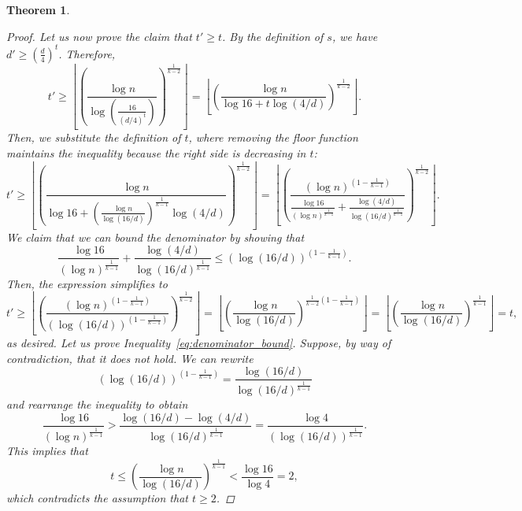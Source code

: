 \documentclass{amsart}
\newtheorem{theorem}[subsection]{Theorem}
\begin{document}
\begin{theorem}
\begin{proof}
        Let us now prove the claim that $t' \geq t$.
        By the definition of $s$, we have $d' \geq \left( \frac{d}{4}\right)^t$.
        Therefore,
        \[
            t' \geq
\left\lfloor \left(  \frac{\log n}{\log \left(\frac{16}{(d/4)^t}\right)}\right)^
            {\frac{1}{k-2}}\right\rfloor =
\left\lfloor \left(  \frac{\log n}{\log 16 + t \log (4/d)}\right)^
            {\frac{1}{k-2}}\right\rfloor.
        \]
        Then, we substitute the definition of $t$, where removing the floor function
        maintains the inequality because the right side is decreasing in $t$:
        \begin{equation*}
            t' \geq
\left\lfloor \left(  \frac{\log n}
            {\log 16 + \left(  \frac{\log n}{\log (16/d)}\right)^{\frac{1}{k-1}}  \log (4/d)}\right)^
            {\frac{1}{k-2}}\right\rfloor
            =
\left\lfloor \left(  \frac{(\log n)^{\left(1-\frac{1}{k-1}\right)}}
            {\frac{\log 16}{(\log n)^{\frac{1}{k-1}}} + \frac{\log (4/d)}{\log (16/d)^{\frac{1}{k-1}}} }
           \right)^{\frac{1}{k-2}}\right\rfloor.
        \end{equation*}
        We claim that we can bound the denominator by showing that
        \begin{equation} \label{eq:denominator_bound}
            \frac{\log 16}{(\log n)^{\frac{1}{k-1}}} + \frac{\log (4/d)}{\log (16/d)^{\frac{1}{k-1}}}
            \leq \left( \log (16/d)\right)^{\left( 1 - \frac{1}{k-1}\right)}.
        \end{equation}
        Then, the expression simplifies to
        \[
            t'
\geq \left\lfloor \left(  \frac{(\log n)^{\left(1-\frac{1}{k-1}\right)}}
            {\left( \log (16/d)\right)^{\left( 1 - \frac{1}{k-1}\right)}}
            \right)^{\frac{1}{k-2}}\right\rfloor
= \left\lfloor \left(  \frac{\log n}
            {\log (16/d)}
            \right)^{\frac{1}{k-2}\left( 1 - \frac{1}{k-1}\right)}\right\rfloor
            = \left\lfloor \left(  \frac{\log n}{\log (16/d)}\right)^{\frac{1}{k-1}}\right\rfloor
            = t,
        \]
        as desired.
        Let us prove Inequality~\eqref{eq:denominator_bound}.
        Suppose, by way of contradiction, that it does not hold.
        We can rewrite
        \[
            (\log (16/d))^{\left( 1 - \frac{1}{k-1}\right)}
            = \frac{\log (16/d)}{\log (16/d)^{\frac{1}{k-1}}}
        \]
        and rearrange the inequality to obtain
        \[
            \frac{\log 16}{(\log n)^{\frac{1}{k-1}}}
            > \frac{\log (16/d) - \log (4/d)}{\log (16/d)^{\frac{1}{k-1}}}
            = \frac{\log 4}{(\log (16/d))^{\frac{1}{k-1}}}.
        \]
        This implies that
        \[
            t
            \leq \left( \frac{\log n}{\log (16/d)}\right)^{\frac{1}{k-1}}
            < \frac{\log 16}{\log 4} = 2,
        \]
        which contradicts the assumption that $t \geq 2$.
    \end{proof}
\end{theorem}
\end{document}
